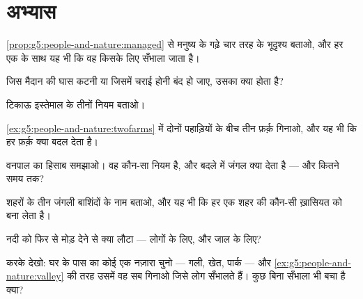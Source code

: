 \section{अभ्यास}

\begin{exercise}[$\star$]\label{exo:g5:people-and-nature:1}
\cref{prop:g5:people-and-nature:managed} से मनुष्य के गढ़े चार तरह के
भूदृश्य बताओ, और हर एक के साथ यह भी कि वह किसके लिए सँभाला जाता है।
\end{exercise}

\begin{exercise}[$\star$]\label{exo:g5:people-and-nature:2}
जिस मैदान की घास कटनी या जिसमें चराई होनी बंद हो जाए, उसका क्या होता है?
\end{exercise}

\begin{exercise}[$\star$]\label{exo:g5:people-and-nature:3}
टिकाऊ इस्तेमाल के तीनों नियम बताओ।
\end{exercise}

\begin{exercise}[$\star$]\label{exo:g5:people-and-nature:4}
\cref{ex:g5:people-and-nature:twofarms} में दोनों पहाड़ियों के बीच तीन
फ़र्क़ गिनाओ, और यह भी कि हर फ़र्क़ क्या बदल देता है।
\end{exercise}

\begin{exercise}[$\star$]\label{exo:g5:people-and-nature:5}
वनपाल का हिसाब समझाओ। वह कौन-सा नियम है, और बदले में जंगल क्या देता है
--- और कितने समय तक?
\end{exercise}

\begin{exercise}[$\star$]\label{exo:g5:people-and-nature:6}
शहरों के तीन जंगली बाशिंदों के नाम बताओ, और यह भी कि हर एक शहर की
कौन-सी ख़ासियत को  बना लेता है।
\end{exercise}

\begin{exercise}[$\star$]\label{exo:g5:people-and-nature:7}
नदी को फिर से मोड़ देने से क्या लौटा --- लोगों के लिए, और जाल के लिए?
\end{exercise}

\begin{exercise}[$\star$]\label{exo:g5:people-and-nature:8}
करके देखो: घर के पास का कोई एक नज़ारा चुनो --- गली, खेत, पार्क --- और
\cref{ex:g5:people-and-nature:valley} की तरह उसमें वह सब गिनाओ जिसे लोग
सँभालते हैं। कुछ बिना सँभाला भी बचा है क्या?
\end{exercise}

